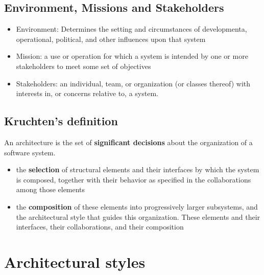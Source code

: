 \documentclass[12pt]{book}
\begin{document}
\subsection*{Environment, Missions and Stakeholders}

\begin{itemize}
  \item Environment: Determines the setting and circumstances of developmenta, operational, political, and other influences upon that system
  \item Mission: a use or operation for which a system is intended by one or more stakeholders to meet some set of objectives
  \item Stakeholders: an individual, team, or organization (or classes thereof) with interests in, or concerns relative to, a system.
\end{itemize}

\subsection*{Kruchten's definition}
An architecture is the set of \textbf{significant decisions} about the organization of a software system.

\begin{itemize}
  \item the \textbf{selection} of structural elements and their interfaces by which the system is composed, together with their behavior as specified in the collaborations among those elements
  \item the \textbf{composition} of these elements into progressively larger subsystems, and the architectural style that guides this organization. These elements and their interfaces, their collaborations, and their composition
\end{itemize}

\section*{Architectural styles}
\end{document}

